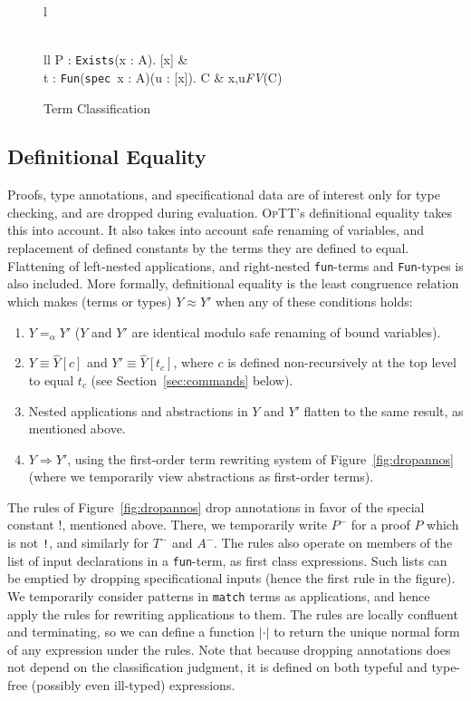 \documentclass[preprint,natbib]{sigplanconf}
\newcommand{\seq}[3]{#1 \vdash #2 : #3}
\newcommand{\optt}{\textsc{OpTT}}
\newcommand{\bang}[0]{\texttt{!}}
\newcommand{\To}{\Rightarrow}
\begin{document}
\begin{figure}
\begin{tabular}{l}
\\
\\

\infer{\seq{\Gamma}{\texttt{existse\_term}\ P\ t}{C}}
{\begin{array}{ll}
\seq{\Gamma}{P}{\texttt{Exists}(x : A). [x]} &\ \\
\seq{\Gamma}{t}{\texttt{Fun}(\texttt{spec}\ x : A)(u : \hat{F}[x]). C & x,u\not\in\textit{FV}(C)}
\end{array}}

\end{tabular}
\caption{\label{fig:cl-term}Term Classification}
\end{figure}

\subsection{Definitional Equality}
\label{sec:defeq}

Proofs, type annotations, and specificational data are of interest
only for type checking, and are dropped during evaluation.  \optt's
definitional equality takes this into account.  It also takes into
account safe renaming of variables, and replacement of defined
constants by the terms they are defined to equal.  Flattening of
left-nested applications, and right-nested \texttt{fun}-terms and
\texttt{Fun}-types is also included.  More formally, definitional
equality is the least congruence relation which makes (terms or types)
$Y \approx Y'$ when any of these conditions holds:
\begin{enumerate}
\item $Y =_\alpha Y'$ ($Y$ and $Y'$ are identical modulo safe renaming
of bound variables).
\item $Y \equiv \hat{Y}[c]$ and $Y' \equiv \hat{Y}[t_c]$, where $c$ is
defined non-recursively at the top level to equal $t_c$ (see
Section~\ref{sec:commands} below).
\item Nested applications and abstractions in $Y$ and $Y'$ flatten
to the same result, as mentioned above.
\item $Y \To Y'$, using the first-order term rewriting system of
Figure~\ref{fig:dropannos} (where we temporarily view abstractions
as first-order terms).  
\end{enumerate}

\noindent The rules of Figure~\ref{fig:dropannos} drop annotations in
favor of the special constant $\bang$, mentioned above.  There, we
temporarily write $P^-$ for a proof $P$ which is not \bang, and
similarly for $T^-$ and $A^-$.  The rules also operate on members of
the list of input declarations in a \texttt{fun}-term, as first class
expressions.  Such lists can be emptied by dropping specificational
inputs (hence the first rule in the figure).  We temporarily consider
patterns in \texttt{match} terms as applications, and hence apply the
rules for rewriting applications to them.  The rules are locally
confluent and terminating, so we can define a function $|\cdot|$ to
return the unique normal form of any expression under the rules.  Note
that because dropping annotations does not depend on the
classification judgment, it is defined on both typeful and type-free
(possibly even ill-typed) expressions.
\end{document}
